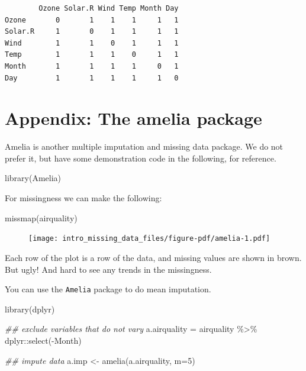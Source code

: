 \documentclass[
  letterpaper,
  DIV=11,
  numbers=noendperiod]{scrreprt}
\newenvironment{Shaded}{\begin{snugshade}}{\end{snugshade}}
\newcommand{\AttributeTok}[1]{\textcolor[rgb]{0.49,0.56,0.16}{#1}}
\newcommand{\DecValTok}[1]{\textcolor[rgb]{0.25,0.63,0.44}{#1}}
\newcommand{\DocumentationTok}[1]{\textcolor[rgb]{0.73,0.13,0.13}{\textit{#1}}}
\newcommand{\FunctionTok}[1]{\textcolor[rgb]{0.02,0.16,0.49}{#1}}
\newcommand{\NormalTok}[1]{\textcolor[rgb]{0.00,0.44,0.13}{#1}}
\newcommand{\OtherTok}[1]{\textcolor[rgb]{0.00,0.44,0.13}{#1}}
\newcommand{\SpecialCharTok}[1]{\textcolor[rgb]{0.25,0.44,0.63}{#1}}
\begin{document}
\begin{verbatim}
        Ozone Solar.R Wind Temp Month Day
Ozone       0       1    1    1     1   1
Solar.R     1       0    1    1     1   1
Wind        1       1    0    1     1   1
Temp        1       1    1    0     1   1
Month       1       1    1    1     0   1
Day         1       1    1    1     1   0
\end{verbatim}

\hypertarget{appendix-the-amelia-package}{%
\section{Appendix: The amelia
package}\label{appendix-the-amelia-package}}

Amelia is another multiple imputation and missing data package. We do
not prefer it, but have some demonstration code in the following, for
reference.

\begin{Shaded}
\begin{Highlighting}[]
  \FunctionTok{library}\NormalTok{(Amelia)}
\end{Highlighting}
\end{Shaded}

For missingness we can make the following:

\begin{Shaded}
\begin{Highlighting}[]
  \FunctionTok{missmap}\NormalTok{(airquality)}
\end{Highlighting}
\end{Shaded}

\begin{figure}[H]

{\centering \texttt{[image: intro\_missing\_data\_files/figure-pdf/amelia-1.pdf]}

}

\end{figure}

Each row of the plot is a row of the data, and missing values are shown
in brown. But ugly! And hard to see any trends in the missingness.

You can use the \texttt{Amelia} package to do mean imputation.

\begin{Shaded}
\begin{Highlighting}[]
  \FunctionTok{library}\NormalTok{(dplyr)}

\DocumentationTok{\#\# exclude variables that do not vary}
\NormalTok{  a.airquality }\OtherTok{=}\NormalTok{ airquality }\SpecialCharTok{\%\textgreater{}\%}\NormalTok{ dplyr}\SpecialCharTok{::}\FunctionTok{select}\NormalTok{(}\SpecialCharTok{{-}}\NormalTok{Month)}

\DocumentationTok{\#\# impute data}
\NormalTok{  a.imp }\OtherTok{\textless{}{-}} \FunctionTok{amelia}\NormalTok{(a.airquality, }\AttributeTok{m=}\DecValTok{5}\NormalTok{)}
\end{Highlighting}
\end{Shaded}
\end{document}

